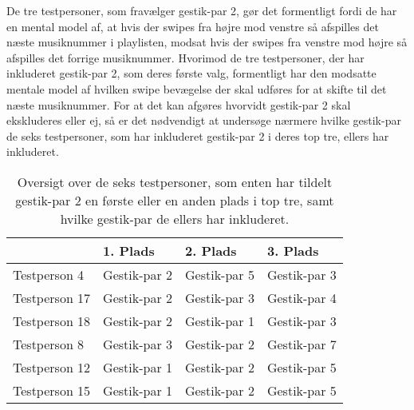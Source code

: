 De tre testpersoner, som fravælger gestik-par 2, gør det formentligt fordi de har en mental model af, at hvis der swipes fra højre mod venstre så afspilles det næste musiknummer i playlisten, modsat hvis der swipes fra venstre mod højre så afspilles det forrige musiknummer. Hvorimod de tre testpersoner, der har inkluderet gestik-par 2, som deres første valg, formentligt har den modsatte mentale model af hvilken swipe bevægelse der skal udføres for at skifte til det næste musiknummer. For at det kan afgøres hvorvidt gestik-par 2 skal ekskluderes eller ej, så er det nødvendigt at undersøge nærmere hvilke gestik-par de seks testpersoner, som har inkluderet gestik-par 2 i deres top tre, ellers har inkluderet. 
%
\begin{table}[H]
	\centering
	\begin{tabular}{ | p{3cm} | p{3cm} | p{3cm} | p{3cm} |}
	\hline
		 & 1. Plads & 2. Plads & 3. Plads \\ \hline
		Testperson 4 & Gestik-par 2 & Gestik-par 5 & Gestik-par 3 \\ \hline
		Testperson 17 & Gestik-par 2 & Gestik-par 3 & Gestik-par 4 \\ \hline
		Testperson 18 & Gestik-par 2 & Gestik-par 1 & Gestik-par 3 \\ \hline
		Testperson 8 & Gestik-par 3 & Gestik-par 2 & Gestik-par 7 \\ \hline
		Testperson 12 & Gestik-par 1 & Gestik-par 2 & Gestik-par 5\\ \hline
		Testperson 15 & Gestik-par 1 & Gestik-par 2 & Gestik-par 5 \\ \hline
	\end{tabular}
	\caption{Oversigt over de seks testpersoner, som enten har tildelt gestik-par 2 en første eller en anden plads i top tre, samt hvilke gestik-par de ellers har inkluderet.}
	\label{tab:GestikPar2ITopTre}
\end{table}
\noindent
%
